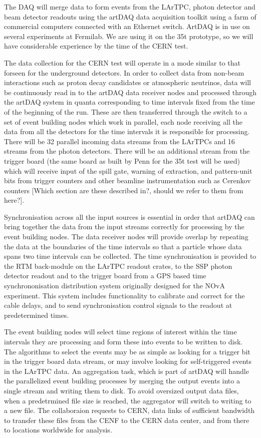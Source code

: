 The DAQ will merge data to form events from the LArTPC, 
photon detector and beam detector readouts using the 
artDAQ data acquisition toolkit using a farm of commercial 
computers connected with an Ethernet switch.  ArtDAQ is 
in use on several experiments at Fermilab.  We are using it
on the 35t prototype, so we will have considerable 
experience by the time of the CERN test.  

The data collection for the CERN test will operate in a mode 
similar to that forseen for the underground detectors. In order 
to collect data from non-beam interactions such as proton decay 
candidates or atmospheric neutrinos, data will be continuously
read in to the artDAQ data receiver nodes and processed through
the artDAQ system in quanta corresponding to time intervals fixed
from the time of the beginning of the run.  These are then 
transferred through the switch to a set of event building nodes 
which work in parallel, each node receiving all the data from all 
the detectors for the time intervals it is responsible for processing.
There will be 32 parallel incoming data streams from the LArTPCs
and 16 streams from the photon detectors.  There will be an additional
stream from the trigger board (the same board as built by Penn for
the 35t test will be used) which will receive input of the spill 
gate, warning of extraction, and pattern-unit bits from trigger counters
and other beamline instrumentation such as Cerenkov counters [Which 
section are these described in?, should we refer to them from here?].

Synchronisation across all the input sources is essential in order 
that artDAQ can bring together the data from the input streams correctly for
processing by the event building nodes.  The data receiver nodes will provide
overlap by repeating the data at the boundaries of the time intervals so 
that a particle whose data spans two time intervals can be collected.  
The time synchronisation is provided to the RTM back-module on the LArTPC 
readout crates, to the SSP photon detector readout and to the trigger board from
a GPS based time synchrononisation distribution system originally designed 
for the NOvA experiment.  This system includes functionality to calibrate and 
correct for the cable delays, and to send synchronisation control signals to
the readout at predetermined times.

The event building nodes will select time regions of interest within the time 
intervals they are processing and form these into events to be written to 
disk. The algorithms to select the events may be as simple as looking for 
a trigger bit in the trigger board data stream, or may involve looking 
for self-triggered events in the LArTPC data.  An aggregation task, which 
is part of artDAQ will handle the parallelized event building processes by 
merging the output events into a single stream and writing them to disk.
To avoid oversized output data files, when a predetrmined file size is reached, 
the aggregator will switch to writing to a new file.  The collaboraion 
requests to CERN, data links of sufficient bandwidth to transfer these files 
from the CENF to the CERN data center, and from there to locations 
worldwide for analysis. 


